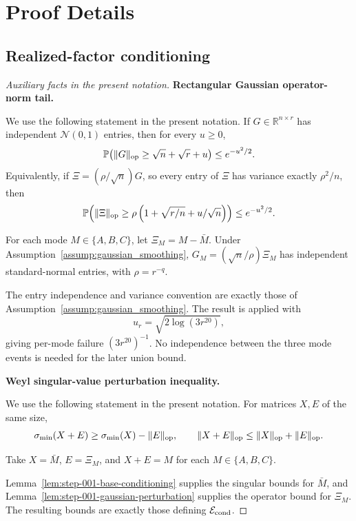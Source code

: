 \appendix

\section{Proof Details}\label{sec:proof-details}

\subsection{Realized-factor conditioning}\label{app:step-001}

\begin{proof}[Auxiliary facts in the present notation]


\medskip\noindent\textbf{Rectangular Gaussian operator-norm tail.}\par

We use the following statement in the present notation. If \(G\in\mathbb R^{n\times r}\) has independent
\(\mathcal N(0,1)\) entries, then for every \(u\ge0\),
\[
  \mathbb P\!\left(\|G\|_{\rm op}\ge \sqrt n+\sqrt r+u\right)
  \le e^{-u^2/2}.
\]
Equivalently, if \(\Xi=(\rho/\sqrt n)G\), so every entry of \(\Xi\) has
variance exactly \(\rho^2/n\), then
\[
  \mathbb P\!\left(
    \|\Xi\|_{\rm op}
    \ge \rho\left(1+\sqrt{r/n}+u/\sqrt n\right)
  \right)
  \le e^{-u^2/2}.
\]

For each mode \(M\in\{A,B,C\}\), let
\(\Xi_M=M-\bar M\). Under
Assumption~\ref{assump:gaussian_smoothing},
\(G_M=(\sqrt n/\rho)\Xi_M\) has independent standard-normal entries, with
\(\rho=r^{-q}\).

The entry independence and variance convention are exactly those of
Assumption~\ref{assump:gaussian_smoothing}. The result is applied with
\[
  u_r=\sqrt{2\log(3r^{20})},
\]
giving per-mode failure \((3r^{20})^{-1}\). No independence between the three
mode events is needed for the later union bound.


\medskip\noindent\textbf{Weyl singular-value perturbation inequality.}\par

We use the following statement in the present notation. For matrices \(X,E\) of the same size,
\[
  \sigma_{\min}(X+E)\ge \sigma_{\min}(X)-\|E\|_{\rm op},
  \qquad
  \|X+E\|_{\rm op}\le \|X\|_{\rm op}+\|E\|_{\rm op}.
\]

Take \(X=\bar M\), \(E=\Xi_M\), and
\(X+E=M\) for each \(M\in\{A,B,C\}\).

Lemma~\ref{lem:step-001-base-conditioning}
supplies the singular bounds for \(\bar M\), and
Lemma~\ref{lem:step-001-gaussian-perturbation} supplies the operator bound for
\(\Xi_M\). The resulting bounds are exactly those defining
\(\mathcal E_{\rm cond}\).

\end{proof}



